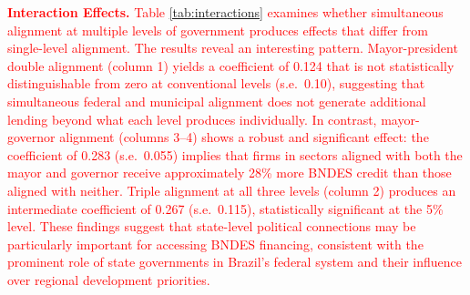 \documentclass{article}
\begin{document}
\textcolor{red}{\textbf{Interaction Effects.} Table \ref{tab:interactions} examines whether simultaneous alignment at multiple levels of government produces effects that differ from single-level alignment. The results reveal an interesting pattern. Mayor-president double alignment (column 1) yields a coefficient of 0.124 that is not statistically distinguishable from zero at conventional levels (s.e.~0.10), suggesting that simultaneous federal and municipal alignment does not generate additional lending beyond what each level produces individually. In contrast, mayor-governor alignment (columns 3--4) shows a robust and significant effect: the coefficient of 0.283 (s.e.~0.055) implies that firms in sectors aligned with both the mayor and governor receive approximately 28\% more BNDES credit than those aligned with neither. Triple alignment at all three levels (column 2) produces an intermediate coefficient of 0.267 (s.e.~0.115), statistically significant at the 5\% level. These findings suggest that state-level political connections may be particularly important for accessing BNDES financing, consistent with the prominent role of state governments in Brazil's federal system and their influence over regional development priorities.}
\end{document}
